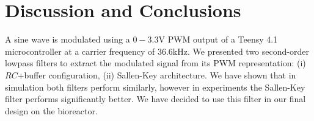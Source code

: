 \vspace{-1em}
\section{Discussion and Conclusions}
\vspace{-1em}

A sine wave is modulated using a $0-3.3$\unit{\volt} PWM output of a Teensy 4.1
microcontroller at a carrier frequency of $36.6$\unit{\kilo\hertz}. We presented
two second-order lowpass filters to extract the modulated signal from its PWM
representation: (i) $RC$+buffer configuration, (ii) Sallen-Key architecture. We
have shown that in simulation both filters perform similarly, however in
experiments the Sallen-Key filter performs significantly better. We have decided
to use this filter in our final design on the bioreactor.
